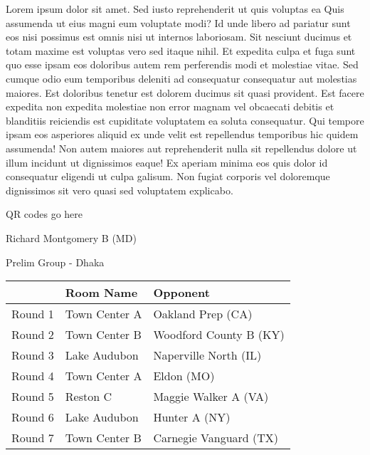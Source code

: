 \documentclass{article}%
\begin{document}
\vspace*{8pt}%
\linebreak%
\newline%
\newline%
Lorem ipsum dolor sit amet. Sed iusto reprehenderit ut quis voluptas ea Quis assumenda ut eius magni eum voluptate modi? Id unde libero ad pariatur sunt eos nisi possimus est omnis nisi ut internos laboriosam. Sit nesciunt ducimus et totam maxime est voluptas vero sed itaque nihil. Et expedita culpa et fuga sunt quo esse ipsam eos doloribus autem rem perferendis modi et molestiae vitae.\newline%
\newline%
Sed cumque odio eum temporibus deleniti ad consequatur consequatur aut molestias maiores. Est doloribus tenetur est dolorem ducimus sit quasi provident. Est facere expedita non expedita molestiae non error magnam vel obcaecati debitis et blanditiis reiciendis est cupiditate voluptatem ea soluta consequatur. Qui tempore ipsam eos asperiores aliquid ex unde velit est repellendus temporibus hic quidem assumenda!\newline%
\newline%
Non autem maiores aut reprehenderit nulla sit repellendus dolore ut illum incidunt ut dignissimos eaque! Ex aperiam minima eos quis dolor id consequatur eligendi ut culpa galisum. Non fugiat corporis vel doloremque dignissimos sit vero quasi sed voluptatem explicabo.\newline%
\newline%
%
\vspace*{30pt}%
\begin{center}%
\begin{Huge}%
QR codes go here%
\end{Huge}%
\end{center}%
\newpage%
%
\begin{center}%
\begin{Huge}%
Richard Montgomery B (MD)%
\end{Huge}%
\vspace*{8pt}%
\linebreak%
\begin{Large}%
Prelim Group {-} Dhaka%
\end{Large}%
\end{center}%
\begin{tabularx}{\textwidth}{|c|Y|Y|}%
\hline%
&Room Name&Opponent\\%
\hline%
Round 1&Town Center A&Oakland Prep (CA)\\%
Round 2&Town Center B&Woodford County B (KY)\\%
Round 3&Lake Audubon&Naperville North (IL)\\%
Round 4&Town Center A&Eldon (MO)\\%
Round 5&Reston C&Maggie Walker A (VA)\\%
Round 6&Lake Audubon&Hunter A (NY)\\%
Round 7&Town Center B&Carnegie Vanguard (TX)\\%
\hline%
\end{tabularx}%
\end{document}
